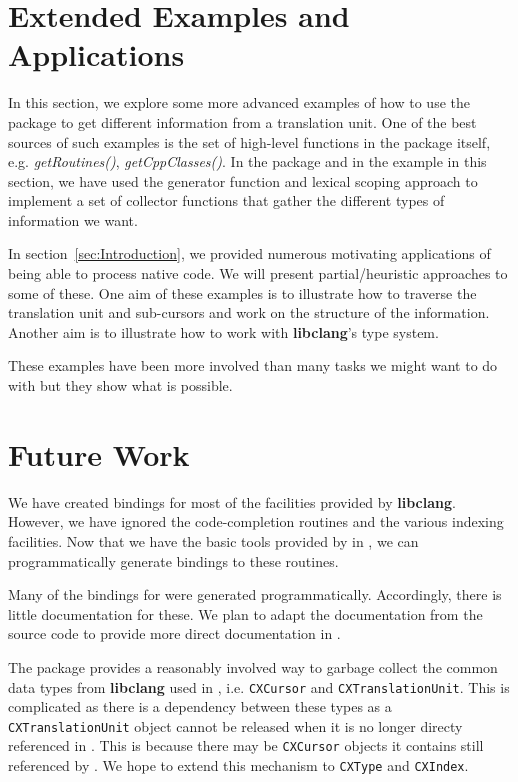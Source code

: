 \documentclass[article]{jss}
\def\C{\proglang{C}}
\def\R{\proglang{R}}
\def\Rpkg#1{\pkg{#1}}
\def\Rfunc#1{\textsl{#1()}}
\def\Ctype#1{\texttt{#1}}
\def\libclang{\textbf{libclang}}
\begin{document}
\section{Extended Examples and Applications}\label{sec:Examples}
In this section, we explore some more advanced examples of how to use
the \Rpkg{RCIndex} package to get different information from a
translation unit.  One of the best sources of such examples is the set
of high-level functions in the package itself,
e.g. \Rfunc{getRoutines}, \Rfunc{getCppClasses}.  In the package and
in the example in this section, we have used the generator function
and lexical scoping approach to implement a set of collector functions
that gather the different types of information we want.

In section~\ref{sec:Introduction}, we provided numerous motivating
applications of being able to process native code.  We will present
partial/heuristic approaches to some of these.  One aim of these
examples is to illustrate how to traverse the translation unit and
sub-cursors and work on the structure of the information.  Another aim
is to illustrate how to work with \libclang's type system.







These examples have been more involved than many tasks we might want
to do with \Rpkg{RCIndex} but they show what is possible. 





\section{Future Work}

We have created bindings for most of the facilities provided by
\libclang.  However, we have ignored the code-completion routines and
the various indexing facilities.  Now that we have the basic tools
provided by \Rpkg{RCIndex} in \R, we can programmatically generate
bindings to these routines. 

Many of the bindings for \Rpkg{RCIndex} were generated
programmatically. Accordingly, there is little documentation for
these. We plan to adapt the documentation from the source code
to provide more direct documentation in \R.

The package provides a reasonably involved way to garbage collect the
common \C{} data types from \libclang{} used in \R,
i.e. \Ctype{CXCursor} and \Ctype{CXTranslationUnit}.  This is
complicated as there is a dependency between these types as a
\Ctype{CXTranslationUnit} object cannot be released when it is no
longer directy referenced in \R. This is because there may be
\Ctype{CXCursor} objects it contains still referenced by \R.  We hope
to extend this mechanism to \Ctype{CXType} and \Ctype{CXIndex}.
\end{document}
